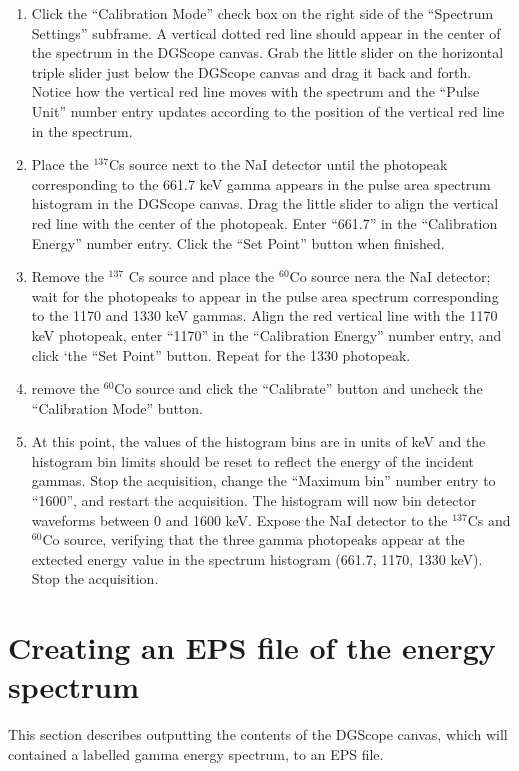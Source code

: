 \begin{enumerate}
{      that the spectrum contains the expectd features for a NaI
      detector: photoabsorption peak, Compton gap and edge, Compton
      continuum, gamma backscatter peak, etc.}
    \item{Click the ``Calibration Mode'' check box on the right side
      of the ``Spectrum Settings'' subframe. A vertical dotted red
      line should appear in the center of the spectrum in the DGScope
      canvas. Grab the little slider on the horizontal triple slider
      just below the DGScope canvas and drag it back and forth. Notice
      how the vertical red line moves with the spectrum and the
      ``Pulse Unit'' number entry updates according to the position of
      the vertical red line in the spectrum.}
    \item{Place the $^{137}$Cs source next to the NaI detector until
      the photopeak corresponding to the 661.7 keV gamma appears in
      the pulse area spectrum histogram in the DGScope canvas. Drag
      the little slider to align the vertical red line with the center
      of the photopeak. Enter ``661.7'' in the ``Calibration Energy''
      number entry. Click the ``Set Point'' button when finished.}
    \item{Remove the $^{137}$ Cs source and place the $^{60}$Co source
      nera the NaI detector; wait for the photopeaks to appear in the
      pulse area spectrum corresponding to the 1170 and 1330 keV
      gammas. Align the red vertical line with the 1170 keV photopeak,
      enter ``1170'' in the ``Calibration Energy'' number entry, and
      click `the ``Set Point'' button. Repeat for the 1330 photopeak.}
    \item{remove the $^{60}$Co source and click the ``Calibrate''
      button and uncheck the ``Calibration Mode'' button.}
    \item{At this point, the values of the histogram bins are in units
      of keV and the histogram bin limits should be reset to reflect
      the energy of the incident gammas. Stop the acquisition, change
      the ``Maximum bin'' number entry to ``1600'', and restart the
      acquisition. The histogram will now bin detector waveforms
      between 0 and 1600 keV. Expose the NaI detector to the
      $^{137}$Cs and $^{60}$Co source, verifying that the three gamma
      photopeaks appear at the extected energy value in the spectrum
      histogram (661.7, 1170, 1330 keV). Stop the acquisition.}
\end{enumerate}

\section{Creating an EPS file of the energy spectrum}
This section describes outputting the contents of the DGScope canvas,
which will contained a labelled gamma energy spectrum, to an EPS file.

